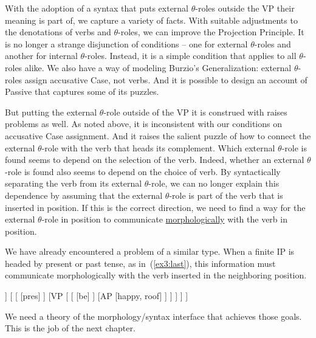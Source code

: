 With the adoption of a syntax that puts external $\theta$-roles outside the VP their meaning is part of, we capture a variety of facts. With suitable adjustments to the denotations of verbs and $\theta$-roles, we can improve the Projection Principle. It is no longer a strange disjunction of conditions -- one for external $\theta$-roles and another for internal $\theta$-roles. Instead, it is a simple condition that applies to all $\theta$-roles alike. We also have a way of modeling Burzio's Generalization: external $\theta$-roles assign accusative Case, not verbs. And it is possible to design an account of Passive that captures some of its puzzles. 

But putting the external $\theta$-role outside of the VP it is construed with raises problems as well. As noted above, it is inconsistent with our conditions on accusative Case assignment. And it raises the salient puzzle of how to connect the external $\theta$-role with the verb that heads its complement. Which external $\theta$-role is found seems to depend on the selection of the verb. Indeed, whether an external $\theta$-role is found also seems to depend on the choice of verb. By syntactically separating the verb from its external $\theta$-role, we can no longer explain this dependence by assuming that the external $\theta$-role is part of the verb that is inserted in  position. If this is the correct direction, we need to find a way for the external $\theta$-role in  position to communicate \underline{morphologically} with the verb in  position.

We have already encountered a problem of a similar type. When a finite IP is headed by present or past tense, as in~(\ref{ex3:last}), this information must communicate morphologically with the verb inserted in the neighboring  position.
\begin{exe}
	\raggedright
	\ex \label{ex3:last} 
	\small
	\begin{forest}
	[IP	
		[DP [she, roof] ]
		[ 
			[ [pres] ]
			[VP [ 
				[ [be] ]
				[AP [happy, roof] ]
			] ]
		]
	]
	\end{forest}
\end{exe}

We need a theory of the morphology/syntax interface that achieves those goals. This is the job of the next chapter.